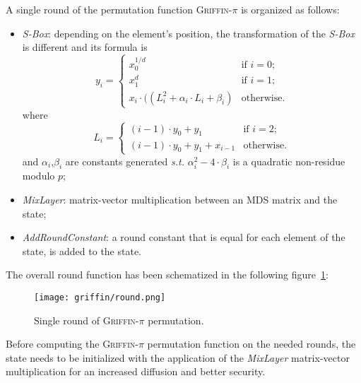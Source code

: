 \documentclass[12pt, a4paper]{report}
\begin{document}
A single round of the permutation function \textsc{Griffin-$\pi$} is organized as follows:
\begin{itemize}
  \item \textit{S-Box}: depending on the element's position, the transformation of the \textit{S-Box} is different and its formula is
  \begin{equation}
    y_i = \left\{
      \begin{array}{ll}
        x_0^{1/d} & \text{if } i = 0; \\
        x_1^{d} & \text{if } i = 1; \\
        x_i \cdot ((L_i^2 + \alpha_i \cdot L_i + \beta_i) & \text{otherwise}.
      \end{array}
    \right.
    \label{eq:griffinsbox}
  \end{equation}
  where
  \begin{equation}
    L_i = \left\{
      \begin{array}{ll}
        (i-1) \cdot y_0 + y_1 & \text{if } i = 2; \\
        (i-1) \cdot y_0 + y_1 + x_{i-1} & \text{otherwise}.
      \end{array}
    \right.
    \label{eq:griffinli}
  \end{equation}
  and $\alpha_i$,$\beta_i$ are constants generated \textsl{s.t.} $\alpha_i^2 - 4 \cdot \beta_i$ is a quadratic non-residue modulo $p$;
  \item \textit{MixLayer}: matrix-vector multiplication between an MDS matrix and the state;
  \item \textit{AddRoundConstant}: a round constant that is equal for each element of the state, is added to the state.
\end{itemize}

The overall round function has been schematized in the following figure~\ref{fig:griffin}:
\begin{figure}[H]
  \begin{center}
    \texttt{[image: griffin/round.png]}
  \end{center}
  \caption{Single round of \textsc{Griffin-$\pi$} permutation.}\label{fig:griffin}
\end{figure}

Before computing the \textsc{Griffin-$\pi$} permutation function on the needed rounds, the state needs to be initialized with the application of the \textit{MixLayer} matrix-vector multiplication for an increased diffusion and better security.
\end{document}
